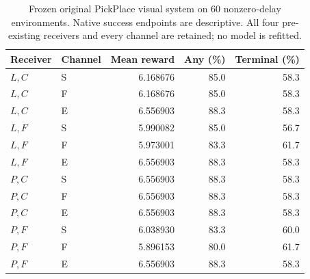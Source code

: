 \begin{table}[H]\centering\small
\caption{Frozen original PickPlace visual system on 60 nonzero-delay environments. Native success endpoints are descriptive. All four pre-existing receivers and every channel are retained; no model is refitted.}\label{s-tab:visualchannelsall}
\begin{tabular}{llrrr}\toprule Receiver & Channel & Mean reward & Any (\%) & Terminal (\%)\\\midrule
$L,C$ & S & 6.168676 & 85.0 & 58.3\\
$L,C$ & F & 6.168676 & 85.0 & 58.3\\
$L,C$ & E & 6.556903 & 88.3 & 58.3\\
$L,F$ & S & 5.990082 & 85.0 & 56.7\\
$L,F$ & F & 5.973001 & 83.3 & 61.7\\
$L,F$ & E & 6.556903 & 88.3 & 58.3\\
$P,C$ & S & 6.556903 & 88.3 & 58.3\\
$P,C$ & F & 6.556903 & 88.3 & 58.3\\
$P,C$ & E & 6.556903 & 88.3 & 58.3\\
$P,F$ & S & 6.038930 & 83.3 & 60.0\\
$P,F$ & F & 5.896153 & 80.0 & 61.7\\
$P,F$ & E & 6.556903 & 88.3 & 58.3\\
\bottomrule\end{tabular}\end{table}
